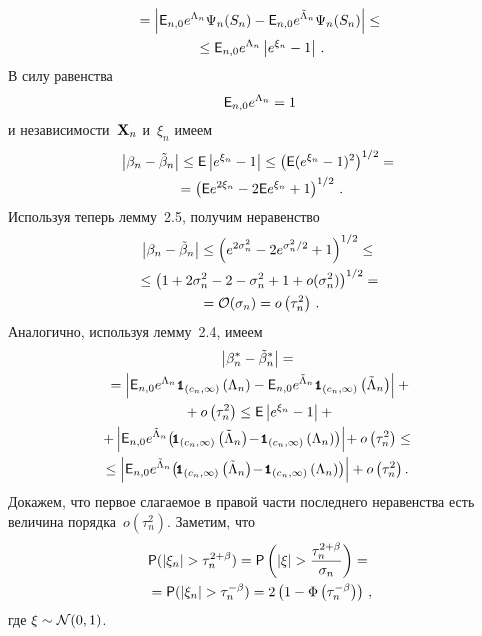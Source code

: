 \begin{multicols}{2}
\noindent
\begin{multline*}
{}
=\left|{{\sf E}}_{n,0}e^{\Lambda_n}\Psi_n(S_n)-{{\sf E}}_{n,0}e^{\tilde\Lambda_n}\Psi_n(S_n)\right|\leq{}\\
{}\leq
{{\sf E}}_{n,0}e^{\Lambda_n}\left|e^{\xi_n}-1\right|\,.
\end{multline*}
В силу равенства
$$
{{\sf E}}_{n,0}e^{\Lambda_n}=1
$$
и независимости~${\bf X}_n$ и~$\xi_n$ имеем
\begin{multline*}
\left|\beta_n-\tilde\beta_n\right|\leq{{\sf E}}\left|e^{\xi_n}-1\right|\leq\left({{\sf E}}(e^{\xi_n}-1)^2\right)^{1/2}={}\\
{}=
\left({{\sf E}}e^{2\xi_n}-2{{\sf E}}e^{\xi_n}+1\right)^{1/2}\,.
\end{multline*}
Используя теперь лемму~2.5, получим неравенство
\begin{multline*}
\left|\beta_n-\tilde\beta_n\right|\leq\left(
e^{2\sigma_n^2}-2e^{\sigma_n^2/2}+1\right)^{1/2}\leq{}\\
{}\leq
\left(1+2\sigma_n^2-2-\sigma_n^2+1+ o(\sigma_n^2) \right)^{1/2}={}\\
{}={\cal O}(\sigma_n)=o\left(\tau_n^2\right)\,.
\end{multline*}
Аналогично, используя лемму~2.4, имеем
\begin{multline*}
\left|\beta_n^*-\tilde\beta_n^*\right|={}\\
{}=\left|{\e}_{n,0}e^{\Lambda_n}{\Ik}_{\left(c_n,\infty\right)}\left(\Lambda_n\right)-{\e}_{n,0}
e^{\tilde\Lambda_n}{\Ik}_{\left(c_n,\infty\right)}\left(\tilde\Lambda_n\right)\right|+{}\\
{}+ o\left(\tau_n^2\right)\leq{\e}\left|e^{\xi_n}-1\right|+{}\\
\!\!+\left|{\e}_{n,0}e^{\tilde\Lambda_n}\!\left(\!{\Ik}_{\left(c_n,\infty\right)}
\left(\tilde\Lambda_n\right)\!-\!{\Ik}_{\left(c_n,\infty\right)}
\left(\Lambda_n\right)\right)\right|\!+o\left(\tau_n^2\right)\leq\\
\!\!\leq\left|{\e}_{n,0}e^{\tilde\Lambda_n}
\!\left(\!{\Ik}_{\left(c_n,\infty\right)}\left(\tilde\Lambda_n\right)\!-\!{\Ik}_{\left(c_n,\infty\right)}
\left(\Lambda_n\right)\right)\right|+o\left(\tau_n^2\right).
\end{multline*}
Докажем, что первое слагаемое в правой части последнего неравенства есть величина 
порядка~$o\left(\tau_n^2\right)$. Заметим, что
\begin{multline*}
{\p}(\left|\xi_n\right|>\tau_n^{2+\beta})={\p}\left(|\xi|>\fr{\tau_n^{2+\beta}}{\sigma_n}\right)={}\\
{}={\p}(|\xi_n|>\tau_n^{-\beta})= 2\left(1-\Phi\left(\tau_n^{-\beta}\right)\right)\,,
\end{multline*}
где $\xi\sim{\cal N}(0,1)$.


\end{multicols}
